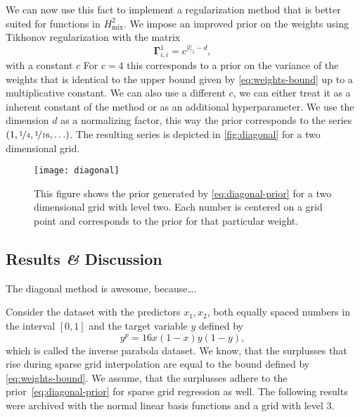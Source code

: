 We can now use this fact to implement a regularization method that is better
suited for functions in \(H^2_\text{mix}\).
We impose an improved prior on the weights using Tikhonov regularization
with the matrix
\begin{equation}\label{eq:diagonal-prior}
\bm{\Gamma}_{i,i}^{1} = c^{\vert l \vert_1 - d},
\end{equation}
with a constant \(c\)
For \(c = 4\) this corresponds to a prior on the variance of the weights that is identical to the upper bound given by \cref{eq:weights-bound} up to a multiplicative constant.
We can also use a different \(c\), we can either treat it as a inherent constant
of the method or as an additional hyperparameter.
We use the dimension \(d\) as a normalizing factor, this way the prior
corresponds to the series \((1, \nicefrac{1}{4}, \nicefrac{1}{16}, \ldots)\).
The resulting series is depicted in \vref{fig:diagonal} for a two dimensional grid.

\begin{figure}[h]
  \begin{minipage}[c]{0.6\textwidth}
    \texttt{[image: diagonal]}
  \end{minipage}\hfill
  \begin{minipage}[c]{0.4\textwidth}
\caption[Diagonal Regularization]{
This figure shows the prior generated by \cref{eq:diagonal-prior} for a two
dimensional grid with level two. Each number is centered on a grid point and
corresponds to the prior for that particular weight.
}\label{fig:diagonal}
  \end{minipage}
\end{figure}

\subsection{Results \textit{\&} Discussion}
The diagonal method is awesome, because\ldots.

Consider the dataset with the predictors \(x_1, x_2\), both equally spaced
numbers in the interval \([0,1]\) and the target variable \(y\) defined by
\begin{equation*}
  y^p = 16x(1-x)y(1-y),
\end{equation*}
which is called the inverse parabola dataset.
We know, that the surplusses that rise during sparse grid interpolation are equal to the bound defined by
\cref{eq:weights-bound}.
We assume, that the surplusses adhere to the prior~\ref{eq:diagonal-prior} for
sparse grid regression as well.
The following results were archived with the normal linear basis functions and a
grid with level 3.

